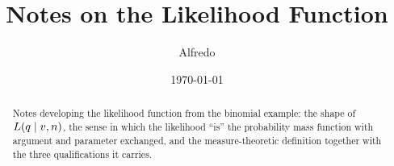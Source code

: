 \documentclass[11pt]{article}
\title{Notes on the Likelihood Function}
\author{Alfredo}
\date{\today}
\begin{document}
\maketitle

\begin{abstract}
Notes developing the likelihood function from the binomial example: the shape of
$L(q \mid v, n)$, the sense in which the likelihood ``is'' the probability
mass function with argument and parameter exchanged, and the measure-theoretic
definition together with the three qualifications it carries.
\end{abstract}

\tableofcontents
\bigskip




\end{document}
